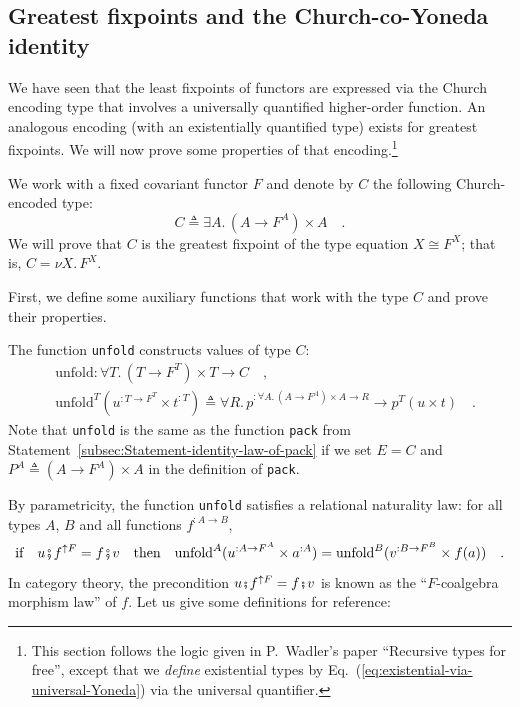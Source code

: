 \subsection{Greatest fixpoints and the Church-co-Yoneda identity\label{subsec:The-greatest-fixpoints-and-Church-co-Yoneda}}

We have seen that the least fixpoints of functors are expressed via
the Church encoding type that involves a universally quantified higher-order
function. An analogous encoding (with an existentially quantified
type) exists for greatest fixpoints. We will now prove some properties
of that encoding.\footnote{This section follows the logic given in P.~Wadler\textsf{'}s paper \textsf{``}Recursive
types for free\textsf{''}, except that we \emph{define} existential types
by Eq.~(\ref{eq:existential-via-universal-Yoneda}) via the universal
quantifier.}

We work with a fixed covariant functor $F$ and denote by $C$ the
following Church-encoded type:
\[
C\triangleq\exists A.\,(A\rightarrow F^{A})\times A\quad.
\]
We will prove that $C$ is the greatest fixpoint of the type equation
$X\cong F^{X}$; that is, $C=\nu X.\,F^{X}$. 

First, we define some auxiliary functions that work with the type
$C$ and prove their properties.

The function \lstinline!unfold! constructs values of type $C$:
\begin{align*}
 & \text{unfold}:\forall T.\,(T\rightarrow F^{T})\times T\rightarrow C\quad,\\
 & \text{unfold}^{T}(u^{:T\rightarrow F^{T}}\times t^{:T})\triangleq\forall R.\,p^{:\forall A.\,(A\rightarrow F^{A})\times A\rightarrow R}\rightarrow p^{T}(u\times t)\quad.
\end{align*}
Note that \lstinline!unfold! is the same as the function \lstinline!pack!
from Statement~\ref{subsec:Statement-identity-law-of-pack} if we
set $E=C$ and $P^{A}\triangleq(A\rightarrow F^{A})\times A$ in the
definition of \lstinline!pack!.

By parametricity, the function \lstinline!unfold! satisfies a relational
naturality law: for all types $A$, $B$ and all functions $f^{:A\rightarrow B}$,
\begin{equation}
\text{if}\quad u\bef f^{\uparrow F}=f\bef v\quad\text{then}\quad\text{unfold}^{A}(u^{:A\rightarrow F^{A}}\times a^{:A})=\text{unfold}^{B}(v^{:B\rightarrow F^{B}}\times f(a))\quad.\label{eq:relational-naturality-law-of-unfold}
\end{equation}
In category theory, the precondition $u\bef f^{\uparrow F}=f\bef v$
is known as the \textsf{``}$F$-coalgebra morphism law\textsf{''} of $f$. Let us
give some definitions for reference:

